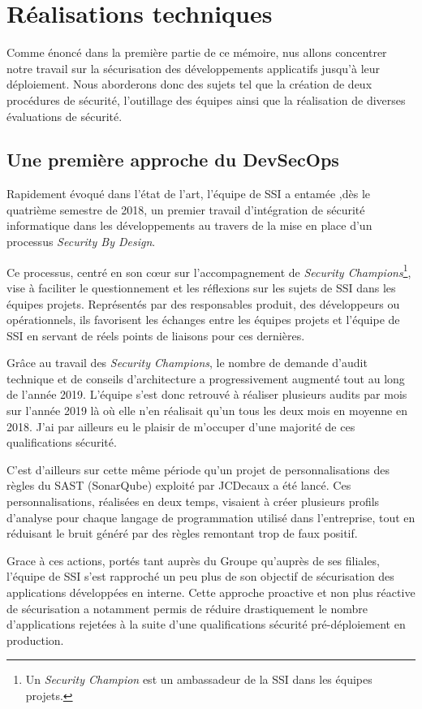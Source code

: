 \chapter{Réalisations techniques}
Comme énoncé dans la première partie de ce mémoire, nus allons concentrer notre travail sur la sécurisation des 
développements applicatifs jusqu'à leur déploiement. Nous aborderons donc des sujets tel que la création de deux 
procédures de sécurité, l'outillage des équipes ainsi que la réalisation de diverses évaluations de sécurité.

\section{Une première approche du DevSecOps}
Rapidement évoqué dans l'état de l'art, l'équipe de \ac{SSI} a entamée ,dès le quatrième semestre de 2018, un premier 
travail d'intégration de sécurité informatique dans les développements au travers de la mise en place d'un processus 
\emph{Security By Design}.

Ce processus, centré en son cœur sur l'accompagnement de \emph{Security Champions}\footnote{Un 
\emph{Security Champion} est un ambassadeur de la \ac{SSI} dans les équipes projets.}, vise à faciliter le questionnement
et  les réflexions sur les sujets de \ac{SSI} dans les équipes projets. Représentés par des responsables produit, des 
développeurs ou opérationnels, ils favorisent les échanges entre les équipes projets et l'équipe de \ac{SSI} en servant 
de réels points de liaisons pour ces dernières.

Grâce au travail des \emph{Security Champions}, le nombre de demande d'audit technique et de conseils d'architecture
a progressivement augmenté tout au long de l'année 2019. L'équipe s'est donc retrouvé à réaliser plusieurs audits par 
mois sur l'année 2019 là où elle n'en réalisait qu'un tous les deux mois en moyenne en 2018. J'ai par ailleurs eu le 
plaisir de m'occuper d'une majorité de ces qualifications sécurité.

C'est d'ailleurs sur cette même période qu'un projet de personnalisations des règles du \ac{SAST} (SonarQube) exploité 
par JCDecaux a été lancé. Ces personnalisations, réalisées en deux temps, visaient à créer plusieurs profils d'analyse 
pour chaque langage de programmation utilisé dans l'entreprise, tout en réduisant le bruit généré par des règles 
remontant trop de faux positif.

Grace à ces actions, portés tant auprès du Groupe qu'auprès de ses filiales, l'équipe de \ac{SSI} s'est rapproché un peu
plus de son objectif de sécurisation des applications développées en interne. Cette approche proactive et non plus 
réactive de sécurisation a notamment permis de réduire drastiquement le nombre d'applications rejetées à la suite d'une 
qualifications sécurité pré-déploiement en production.

